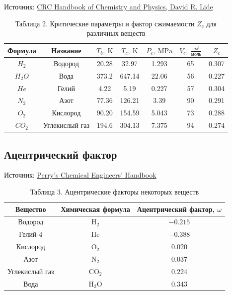 \documentclass[a4paper]{article}
\numberwithin{equation}{subsection} %
\begin{document}
Источник: \href{https://webdelprofesor.ula.ve/ciencias/isolda/libros/handbook.pdf}{CRC Handbook of Chemistry and Physics, David R. Lide}
\begin{table}[h!]
\centering
\begin{tabular}{|c|c|c|c|c|c|c|}
\hline
Формула & Название & $T_b,\ \text{K}$ & $T_c,\ \text{K}$ & $P_c,\ \text{MPa}$ & $V_c,\ \frac{\text{см}^3}{\text{моль}}$ & $Z_c$ \\
\hline
$H_2$ & Водород & 20.28 & 32.97 & 1.293 & 65 & 0.307 \\
$H_2O$ & Вода & 373.2 & 647.14 & 22.06 & 56 & 0.227 \\
$He$ & Гелий & 4.22 & 5.19 & 0.227 & 57 & 0.304 \\
$N_2$ & Азот & 77.36 & 126.21 & 3.39 & 90 & 0.291 \\
$O_2$ & Кислород & 90.20 & 154.59 & 5.043 & 73 & 0.288 \\
$CO_2$ & Углекислый газ & 194.6 & 304.13 & 7.375 & 94 & 0.274 \\
\hline
\end{tabular}
\caption{Таблица 2. Критические параметры и фактор сжимаемости $ Z_c $ для различных веществ}
\end{table}

\subsection{Ацентрический фактор}
Источник: \href{https://students.aiu.edu/submissions/profiles/resources/onlineBook/z5y2E6_Perry-s_Chemical_Engineers-_Handbook.pdf}{Perry's Chemical Engineers' Handbook}
\begin{table}[h!]
    \centering
    \begin{tabular}{|c|c|c|}
        \hline
        Вещество & Химическая формула & Ацентрический фактор, $ \omega $ \\
        \hline
        Водород & H$_2$ & $-0.215$ \\ \hline
        Гелий-4 & He & $-0.388$ \\ \hline
        Кислород & O$_2$ & $0.020$ \\ \hline
        Азот & N$_2$ & $0.037$ \\ \hline
        Углекислый газ & CO$_2$ & $0.224$ \\ \hline
        Вода & H$_2$O & $0.343$ \\
        \hline
    \end{tabular}
    \caption{Таблица 3. Ацентрические факторы некоторых веществ}
    \label{tab:acentric_factors}
\end{table}
\end{document}

